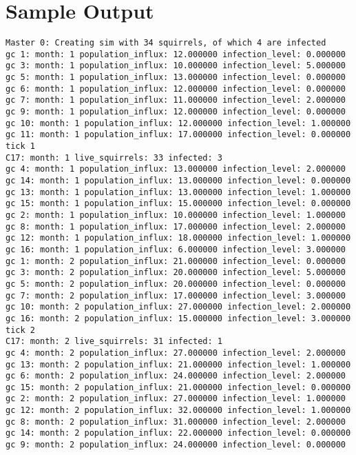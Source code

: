 \appendix
\section{Sample Output}\label{sec:sample}
\begin{lstlisting}[basicstyle=\tiny]
Master 0: Creating sim with 34 squirrels, of which 4 are infected
gc 1: month: 1 population_influx: 12.000000 infection_level: 0.000000
gc 3: month: 1 population_influx: 10.000000 infection_level: 5.000000
gc 5: month: 1 population_influx: 13.000000 infection_level: 0.000000
gc 6: month: 1 population_influx: 12.000000 infection_level: 0.000000
gc 7: month: 1 population_influx: 11.000000 infection_level: 2.000000
gc 9: month: 1 population_influx: 12.000000 infection_level: 0.000000
gc 10: month: 1 population_influx: 12.000000 infection_level: 1.000000
gc 11: month: 1 population_influx: 17.000000 infection_level: 0.000000
tick 1
C17: month: 1 live_squirrels: 33 infected: 3
gc 4: month: 1 population_influx: 13.000000 infection_level: 2.000000
gc 14: month: 1 population_influx: 13.000000 infection_level: 0.000000
gc 13: month: 1 population_influx: 13.000000 infection_level: 1.000000
gc 15: month: 1 population_influx: 15.000000 infection_level: 0.000000
gc 2: month: 1 population_influx: 10.000000 infection_level: 1.000000
gc 8: month: 1 population_influx: 17.000000 infection_level: 2.000000
gc 12: month: 1 population_influx: 18.000000 infection_level: 1.000000
gc 16: month: 1 population_influx: 6.000000 infection_level: 3.000000
gc 1: month: 2 population_influx: 21.000000 infection_level: 0.000000
gc 3: month: 2 population_influx: 20.000000 infection_level: 5.000000
gc 5: month: 2 population_influx: 20.000000 infection_level: 0.000000
gc 7: month: 2 population_influx: 17.000000 infection_level: 3.000000
gc 10: month: 2 population_influx: 27.000000 infection_level: 2.000000
gc 16: month: 2 population_influx: 15.000000 infection_level: 3.000000
tick 2
C17: month: 2 live_squirrels: 31 infected: 1
gc 4: month: 2 population_influx: 27.000000 infection_level: 2.000000
gc 13: month: 2 population_influx: 21.000000 infection_level: 1.000000
gc 6: month: 2 population_influx: 24.000000 infection_level: 2.000000
gc 15: month: 2 population_influx: 21.000000 infection_level: 0.000000
gc 2: month: 2 population_influx: 27.000000 infection_level: 1.000000
gc 12: month: 2 population_influx: 32.000000 infection_level: 1.000000
gc 8: month: 2 population_influx: 31.000000 infection_level: 2.000000
gc 14: month: 2 population_influx: 22.000000 infection_level: 0.000000
gc 9: month: 2 population_influx: 24.000000 infection_level: 0.000000

\end{lstlisting}
